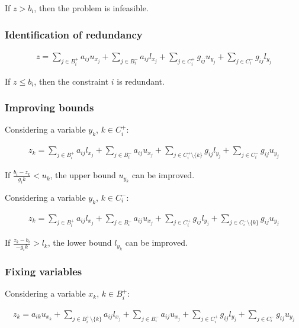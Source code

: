 \documentclass[preprint,12pt]{elsarticle}
\begin{document}
If $z > b_{i}$, then the problem is infeasible.

\subsubsection{Identification of redundancy}

\begin{align}
	z = \sum_{j \in B_i^+}{a_{ij}u_{x_j}} + \sum_{j \in B_i^-}{a_{ij}l_{x_j}} + \sum_{j \in C_i^+}{g_{ij}u_{y_j}} + \sum_{j \in C_i^-}{g_{ij}l_{y_j}}
\end{align}

If $z \leq b_{i}$, then the constraint $i$ is redundant.

\subsubsection{Improving bounds}

Considering a variable $y_k$, $k \in C_i^{+}$:

\begin{align}
	z_k = \sum_{j \in B_i^+}{a_{ij}l_{x_j}} + \sum_{j \in B_i^-}{a_{ij}u_{x_j}} + \sum_{j \in C_i^+ \setminus\{k\}}{g_{ij}l_{y_j}} + \sum_{j \in C_i^-}{g_{ij}u_{y_j}}
\end{align}

If $\frac{b_i - z_k}{g_ik} < u_k$, the upper bound $u_{y_k}$ can be improved.

Considering a variable $y_k$, $k \in C_i^{-}$:

\begin{align}
	z_k = \sum_{j \in B_i^+}{a_{ij}l_{x_j}} + \sum_{j \in B_i^-}{a_{ij}u_{x_j}} + \sum_{j \in C_i^+}{g_{ij}l_{y_j}} + \sum_{j \in C_i^-\setminus\{k\}}{g_{ij}u_{y_j}}
\end{align}

If $\frac{z_k - b_i}{-g_ik} > l_k$, the lower bound $l_{y_k}$ can be improved.

\subsubsection{Fixing variables}

Considering a variable $x_k$, $k \in B_i^{+}$:

\begin{align}
	z_k = a_{ik}u_{x_k} + \sum_{j \in B_i^+\setminus\{k\}}{a_{ij}l_{x_j}} + \sum_{j \in B_i^-}{a_{ij}u_{x_j}} + \sum_{j \in C_i^+}{g_{ij}l_{y_j}} + \sum_{j \in C_i^-}{g_{ij}u_{y_j}}
\end{align}
\end{document}
